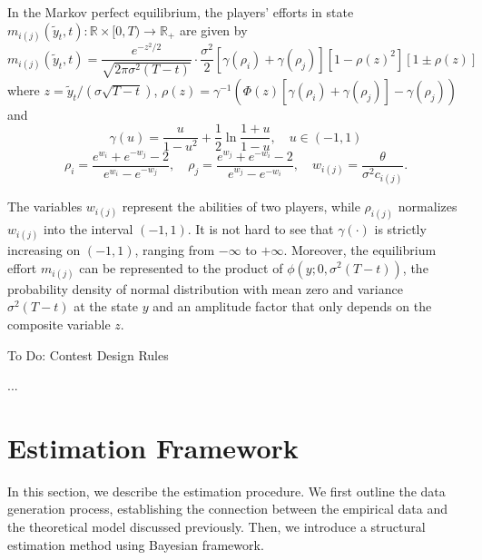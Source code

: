 \documentclass[mnsc]{informs3}
\begin{document}
\begin{lemma}
In the Markov perfect equilibrium, the players’ efforts in state $m_{i(j)}(\tilde{y}_t, t) :\mathbb{R}\times[0, T)\to\mathbb{R}_+$ are given by
\begin{equation}\label{eq-equilibrium-effort}
m_{i(j)}(\tilde{y}_t, t) = \frac{e^{-z^2/2}}{\sqrt{2\pi\sigma^2(T-t)}}\cdot \frac{\sigma^2}{2}\left[\gamma(\rho_{i}) + \gamma(\rho_{j})\right]\left[1-\rho(z)^2\right]\left[1 \pm \rho(z)\right]
\end{equation}
where $z = \tilde{y}_t / (\sigma\sqrt{T-t})$, $\rho(z) = \gamma^{-1}\left(\Phi(z)\left[\gamma(\rho_{i})+\gamma(\rho_{j})\right]-\gamma(\rho_{j})\right)$ and 
\begin{equation*}
\gamma(u) = \frac{u}{1-u^2} + \frac{1}{2}\ln\frac{1+u}{1-u},\quad u\in(-1,1)
\end{equation*}
\begin{equation*}
\rho_{i} = \frac{e^{w_{i}}+e^{-w_{j}}-2}{e^{w_{i}}-e^{-w_{j}}},
\quad
\rho_{j} = \frac{e^{w_{j}}+e^{-w_{i}}-2}{e^{w_{j}}-e^{-w_{i}}},
\quad
w_{i(j)} = \frac{\theta}{\sigma^2 c_{i(j)}}.
\end{equation*}
\end{lemma}

The variables $w_{i(j)}$ represent the abilities of two players, while $\rho_{i(j)}$ normalizes $w_{i(j)}$ into the interval $(-1, 1)$. 
It is not hard to see that $\gamma(\cdot)$ is strictly increasing on $(-1,1)$, ranging from $-\infty$ to $+\infty$. 
Moreover, the equilibrium effort $m_{i(j)}$ can be represented to the product of $\phi(y; 0, \sigma^2(T-t))$, the probability density of normal distribution with mean zero and variance $\sigma^2(T-t)$ at the state $y$ and an amplitude factor that only depends on the composite variable $z$. 

To Do: Contest Design Rules

\begin{proposition}
...
\end{proposition}




\section{Estimation Framework}\label{sect-bayes-framework}

In this section, we describe the estimation procedure. 
We first outline the data generation process, establishing the connection between the empirical data and the theoretical model discussed previously.
Then, we introduce a structural estimation method using Bayesian framework.
\end{document}
